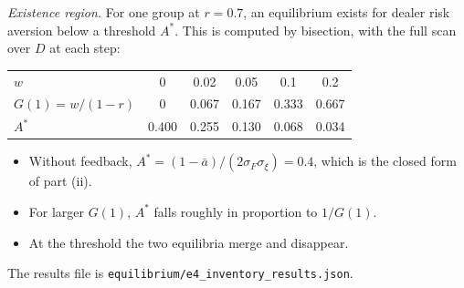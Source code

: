 \documentclass[12pt]{article}
\theoremstyle{definition}
\theoremstyle{remark}
\begin{document}
\emph{Existence region.} For one group at $r=0.7$, an equilibrium exists for dealer risk aversion below a threshold $A^*$. This is computed by bisection, with the full scan over $D$ at each step:
\begin{center}\small
\begin{tabular}{lccccc}
\hline
$w$ & 0 & 0.02 & 0.05 & 0.1 & 0.2\\
$G(1)=w/(1-r)$ & 0 & 0.067 & 0.167 & 0.333 & 0.667\\
$A^*$ & 0.400 & 0.255 & 0.130 & 0.068 & 0.034\\
\hline
\end{tabular}
\end{center}
\begin{itemize}[itemsep=1pt,topsep=2pt]
\item Without feedback, $A^*=(1-\bar a)/(2\sigma_F\sigma_\xi)=0.4$, which is the closed form of part (ii).
\item For larger $G(1)$, $A^*$ falls roughly in proportion to $1/G(1)$.
\item At the threshold the two equilibria merge and disappear.
\end{itemize}
The results file is \nolinkurl{equilibrium/e4_inventory_results.json}.
\end{document}
